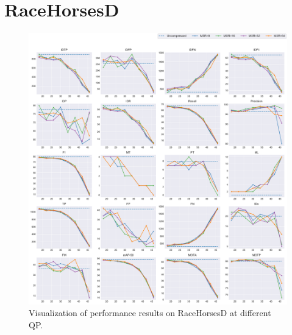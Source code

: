 
\section{RaceHorsesD}
\label{sec:appendix/RaceHorsesD_all}


\begin{figure}[!htbp]
\centering
\includegraphics[width=1.0\linewidth]{img/appendix/RaceHorsesD_all_multiplots_qp.pdf}
\caption[Visualization of performance results on RaceHorsesD at different QP]
{Visualization of performance results on RaceHorsesD at different QP.}
\label{fig:RaceHorsesD_all_qp}
\end{figure}

